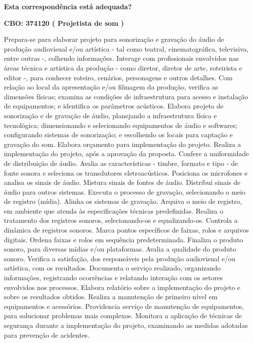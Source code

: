 \documentclass[
]{article}
\begin{document}
\begin{Form}
\textbf{Esta correspondência está adequada?} \\ 
\end{Form}

\textbf{CBO: 374120  ( Projetista de som )}

Prepara-se para elaborar projeto para sonorização e gravação do áudio de
produção audiovisual e/ou artística - tal como teatral, cinematográfica,
televisiva, entre outras -, colhendo informações. Interage com
profissionais envolvidos nas áreas técnica e artística da produção -
como diretor, diretor de arte, roteirista e editor -, para conhecer
roteiro, cenários, personagens e outros detalhes. Com relação ao local
da apresentação e/ou filmagem da produção, verifica as dimensões
físicas; examina as condições de infraestrutura para acesso e instalação
de equipamentos; e identifica os parâmetros acústicos. Elabora projeto
de sonorização e de gravação de áudio, planejando a infraestrutura
física e tecnológica; dimensionando e selecionando equipamentos de áudio
e softwares; configurando sistemas de sonorização; e escolhendo os
locais para captação e gravação do som. Elabora orçamento para
implementação do projeto. Realiza a implementação do projeto, após a
aprovação da proposta. Confere a uniformidade de distribuição de áudio.
Avalia as características - timbre, formato e tipo - de fonte sonora e
seleciona os transdutores eletroacústicos. Posiciona os microfones e
analisa os sinais de áudio. Mistura sinais de fontes de áudio. Distribui
sinais de áudio para outros sistemas. Executa o processo de gravação,
selecionando o meio de registro (mídia). Alinha os sistemas de gravação.
Arquiva o meio de registro, em ambiente que atenda às especificações
técnicas predefinidas. Realiza o tratamento dos registros sonoros,
selecionando-os e equalizando-os. Controla a dinâmica de registros
sonoros. Marca pontos específicos de faixas, rolos e arquivos digitais.
Ordena faixas e rolos em sequência predeterminada. Finaliza o produto
sonoro, para diversas mídias e/ou plataformas. Avalia a qualidade do
produto sonoro. Verifica a satisfação, dos responsáveis pela produção
audiovisual e/ou artística, com os resultados. Documenta o serviço
realizado, organizando informações, registrando ocorrências e relatando
interação com os setores envolvidos nos processos. Elabora relatório
sobre a implementação do projeto e sobre os resultados obtidos. Realiza
a manutenção de primeiro nível em equipamentos e acessórios. Providencia
serviço de manutenção de equipamentos, para solucionar problemas mais
complexos. Monitora a aplicação de técnicas de segurança durante a
implementação do projeto, examinando as medidas adotadas para prevenção
de acidentes.
\end{document}
